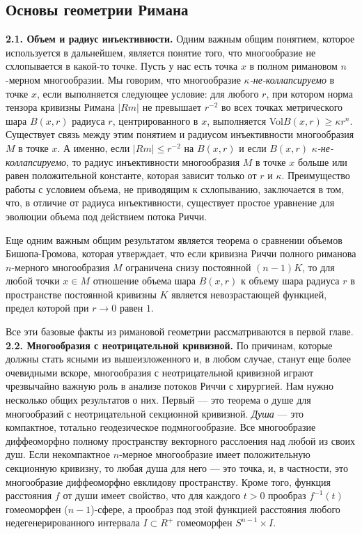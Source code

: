 \subsection{Основы геометрии Римана}

\textbf{2.1. Объем и радиус инъективности.} Одним важным общим понятием, которое 
используется в дальнейшем, является понятие того, что многообразие не схлопывается 
в какой-то точке. Пусть у нас есть точка $x$ в полном римановом $n$-мерном многообразии. 
Мы говорим, что многообразие \textit{$\kappa $-не-коллапсируемо} в точке $x$, если 
выполняется следующее условие: для любого $r$, при котором норма тензора кривизны Римана
$| Rm| $ не превышает $r^{-2}$ во всех точках метрического шара $B(x,r)$ радиуса $r$, центрированного 
в $x$, выполняется Vol$B(x,r)\geq \kappa r^{n}$. Существует связь между этим понятием и радиусом 
инъективности многообразия $M$ в точке $x$. А именно, если $| Rm| \leq r^{-2}$ на $B(x,r)$ и если 
$B(x,r)$ \textit{$\kappa $-не-коллапсируемо}, то радиус инъективности многообразия $M$ в точке 
$x$ больше или равен положительной константе, которая зависит только от $r$ и $\kappa $. 
Преимущество работы с условием объема, не приводящим к схлопыванию, заключается в том, 
что, в отличие от радиуса инъективности, существует простое уравнение для эволюции объема 
под действием потока Риччи.

Еще одним важным общим результатом является теорема о сравнении объемов Бишопа-Громова, 
которая утверждает, что если кривизна Риччи полного риманова $n$-мерного многообразия $M$ 
ограничена снизу постоянной $(n-1)K$, то для любой точки $x\in M$ отношение объема шара 
$B(x,r)$ к объему шара радиуса $r$ в пространстве постоянной кривизны $K$ является 
невозрастающей функцией, предел которой при $r\rightarrow 0$ равен $1$. 

Все эти базовые факты из римановой геометрии рассматриваются в первой главе.\\


\textbf{2.2. Многообразия с неотрицательной кривизной.} По причинам, которые должны стать 
ясными из вышеизложенного и, в любом случае, станут еще более очевидными вскоре, 
многообразия с неотрицательной кривизной играют чрезвычайно важную роль в анализе 
потоков Риччи с хирургией. Нам нужно несколько общих результатов о них. 
Первый — это теорема о душе для многообразий с неотрицательной секционной кривизной. 
\textit{Душа} — это компактное, тотально геодезическое подмногообразие. Все многообразие 
диффеоморфно полному пространству векторного расслоения над любой из своих душ. 
Если некомпактное $n$-мерное многообразие имеет положительную секционную кривизну, 
то любая душа для него — это точка, и, в частности, это многообразие диффеоморфно 
евклидову пространству. Кроме того, функция расстояния $f$ от души имеет свойство, 
что для каждого $t > 0$ прообраз $f^{-1} (t)$ гомеоморфен ($n-1$)-сфере, а прообраз под 
этой функцией расстояния любого недегенерированного интервала $I\subset R^{+}$ гомеоморфен 
$S^{n-1} \times I$.


